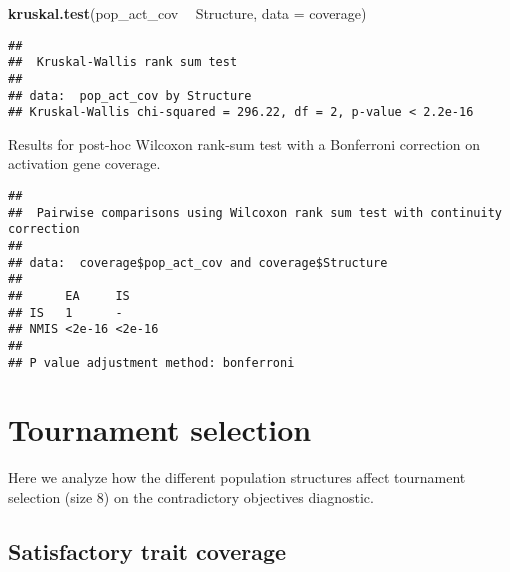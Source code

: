 \documentclass[]{book}
\newenvironment{Shaded}{\begin{snugshade}}{\end{snugshade}}
\newcommand{\DataTypeTok}[1]{\textcolor[rgb]{0.13,0.29,0.53}{#1}}
\newcommand{\KeywordTok}[1]{\textcolor[rgb]{0.13,0.29,0.53}{\textbf{#1}}}
\newcommand{\NormalTok}[1]{#1}
\newcommand{\OperatorTok}[1]{\textcolor[rgb]{0.81,0.36,0.00}{\textbf{#1}}}
\newcommand{\OtherTok}[1]{\textcolor[rgb]{0.56,0.35,0.01}{#1}}
\newcommand{\StringTok}[1]{\textcolor[rgb]{0.31,0.60,0.02}{#1}}
\begin{document}
\begin{Shaded}
\begin{Highlighting}[]
\KeywordTok{kruskal.test}\NormalTok{(pop_act_cov }\OperatorTok{~}\StringTok{ }\NormalTok{Structure, }\DataTypeTok{data =}\NormalTok{ coverage)}
\end{Highlighting}
\end{Shaded}

\begin{verbatim}
## 
##  Kruskal-Wallis rank sum test
## 
## data:  pop_act_cov by Structure
## Kruskal-Wallis chi-squared = 296.22, df = 2, p-value < 2.2e-16
\end{verbatim}

Results for post-hoc Wilcoxon rank-sum test with a Bonferroni correction on activation gene coverage.

\begin{Shaded}
\end{Shaded}

\begin{verbatim}
## 
##  Pairwise comparisons using Wilcoxon rank sum test with continuity correction 
## 
## data:  coverage$pop_act_cov and coverage$Structure 
## 
##      EA     IS    
## IS   1      -     
## NMIS <2e-16 <2e-16
## 
## P value adjustment method: bonferroni
\end{verbatim}

\hypertarget{tournament-selection-6}{%
\section{Tournament selection}\label{tournament-selection-6}}

Here we analyze how the different population structures affect tournament selection (size 8) on the contradictory objectives diagnostic.

\hypertarget{satisfactory-trait-coverage-4}{%
\subsection{Satisfactory trait coverage}\label{satisfactory-trait-coverage-4}}
\end{document}
